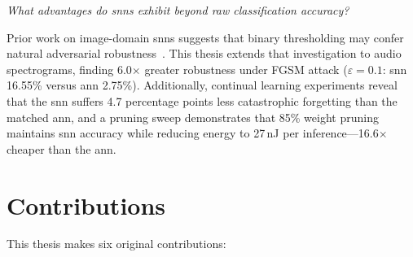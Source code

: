 \begin{description}[style=nextline,leftmargin=1.5cm,labelwidth=1cm]
\item[\textbf{RQ4}] \textit{What advantages do \glspl{snn} exhibit beyond raw classification accuracy?}

Prior work on image-domain \glspl{snn} suggests that binary thresholding may confer natural adversarial robustness~\citep{sharmin2020inherent}.
This thesis extends that investigation to audio spectrograms, finding 6.0$\times$ greater robustness under FGSM attack ($\varepsilon = 0.1$: \gls{snn} 16.55\% versus \gls{ann} 2.75\%).
Additionally, continual learning experiments reveal that the \gls{snn} suffers 4.7 percentage points less catastrophic forgetting than the matched \gls{ann}, and a pruning sweep demonstrates that 85\% weight pruning maintains \gls{snn} accuracy while reducing energy to 27\,nJ per inference---16.6$\times$ cheaper than the \gls{ann}.

\end{description}

\section{Contributions}
\label{sec:contributions}

This thesis makes six original contributions:

